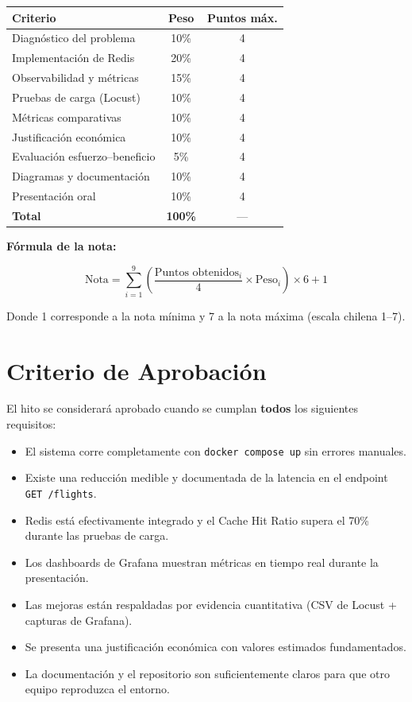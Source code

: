 \documentclass[12pt,a4paper]{article}
\begin{document}
\begin{center}
\begin{tabular}{|l|c|c|}
\hline
\textbf{Criterio} & \textbf{Peso} & \textbf{Puntos máx.} \\
\hline
Diagnóstico del problema        & 10\% & 4 \\
Implementación de Redis         & 20\% & 4 \\
Observabilidad y métricas       & 15\% & 4 \\
Pruebas de carga (Locust)       & 10\% & 4 \\
Métricas comparativas           & 10\% & 4 \\
Justificación económica         & 10\% & 4 \\
Evaluación esfuerzo--beneficio  & 5\%  & 4 \\
Diagramas y documentación       & 10\% & 4 \\
Presentación oral               & 10\% & 4 \\
\hline
\textbf{Total}                  & \textbf{100\%} & --- \\
\hline
\end{tabular}
\end{center}

\vspace{0.4cm}

\textbf{Fórmula de la nota:}

\[
  \text{Nota} = \sum_{i=1}^{9} \left( \frac{\text{Puntos obtenidos}_i}{4} \times \text{Peso}_i \right) \times 6 + 1
\]

Donde 1 corresponde a la nota mínima y 7 a la nota máxima (escala chilena 1--7).

\section{Criterio de Aprobación}

El hito se considerará aprobado cuando se cumplan \textbf{todos} los siguientes requisitos:

\begin{itemize}
  \item El sistema corre completamente con \texttt{docker compose up} sin errores manuales.
  \item Existe una reducción medible y documentada de la latencia en el endpoint \texttt{GET /flights}.
  \item Redis está efectivamente integrado y el Cache Hit Ratio supera el 70\% durante las pruebas de carga.
  \item Los dashboards de Grafana muestran métricas en tiempo real durante la presentación.
  \item Las mejoras están respaldadas por evidencia cuantitativa (CSV de Locust + capturas de Grafana).
  \item Se presenta una justificación económica con valores estimados fundamentados.
  \item La documentación y el repositorio son suficientemente claros para que otro equipo reproduzca el entorno.
\end{itemize}
\end{document}
